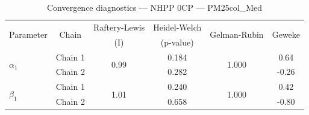 \begin{table}[H]
\centering
\caption{Convergence diagnostics — NHPP 0CP — PM25col_Med}
\begin{tabular}{lccccc}
\toprule
\multirow{2}{*}{Parameter} & \multirow{2}{*}{Chain} & Raftery-Lewis & Heidel-Welch & \multirow{2}{*}{Gelman-Rubin} & \multirow{2}{*}{Geweke} \\
 & & (I) & (p-value) & & (z) \\
\midrule
\multirow{2}{*}{$\alpha_1$} & Chain 1 & \multirow{2}{*}{0.99} & 0.184 & \multirow{2}{*}{1.000} & 0.64 \\
 & Chain 2 & & 0.282 & & -0.26 \\
\midrule
\multirow{2}{*}{$\beta_1$} & Chain 1 & \multirow{2}{*}{1.01} & 0.240 & \multirow{2}{*}{1.000} & 0.42 \\
 & Chain 2 & & 0.658 & & -0.80 \\
\bottomrule
\end{tabular}
\end{table}
